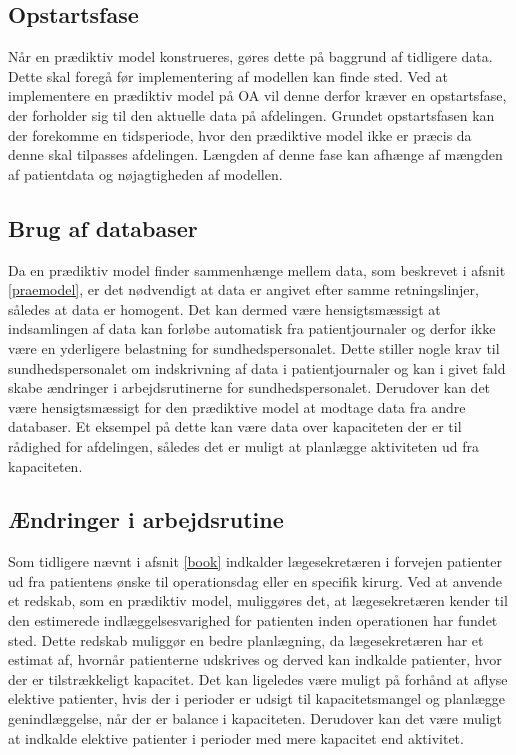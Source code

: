 \subsection{Opstartsfase}
Når en prædiktiv model konstrueres, gøres dette på baggrund af tidligere data. Dette skal foregå før implementering af modellen kan finde sted. Ved at implementere en prædiktiv model på OA vil denne derfor kræver en opstartsfase, der forholder sig til den aktuelle data på afdelingen. Grundet opstartsfasen kan der forekomme en tidsperiode, hvor den prædiktive model ikke er præcis da denne skal tilpasses afdelingen. Længden af denne fase kan afhænge af mængden af patientdata og nøjagtigheden af modellen.\cite{Kuhn2013}


\subsection{Brug af databaser}
Da en prædiktiv model finder sammenhænge mellem data, som beskrevet i afsnit \ref{praemodel}, er det nødvendigt at data er angivet efter samme retningslinjer, således at data er homogent\cite{Kuhn2013}. Det  kan dermed være hensigtsmæssigt at indsamlingen af data kan forløbe automatisk fra patientjournaler og derfor ikke være en yderligere belastning for sundhedspersonalet. Dette stiller nogle krav til sundhedspersonalet om indskrivning af data i patientjournaler og kan i givet fald skabe ændringer i arbejdsrutinerne for sundhedspersonalet. Derudover kan det være hensigtsmæssigt for den prædiktive model at modtage data fra andre databaser. Et eksempel på dette kan være data over kapaciteten der er til rådighed for afdelingen, således det er muligt at planlægge aktiviteten ud fra kapaciteten.


\subsection{Ændringer i arbejdsrutine}\label{arbjedsrut}
Som tidligere nævnt i afsnit \ref{book} indkalder lægesekretæren i forvejen patienter ud fra patientens ønske til operationsdag eller en specifik kirurg. Ved at anvende et redskab, som en prædiktiv model, muliggøres det, at lægesekretæren kender til den estimerede indlæggelsesvarighed for patienten inden operationen har fundet sted. 
Dette redskab muliggør en bedre planlægning, da lægesekretæren har et estimat af, hvornår patienterne udskrives og derved kan indkalde patienter, hvor der er tilstrækkeligt kapacitet. 
Det kan ligeledes være muligt på forhånd at aflyse elektive patienter, hvis der i perioder er udsigt til kapacitetsmangel og planlægge genindlæggelse, når der er balance i kapaciteten. Derudover kan det være muligt at indkalde elektive patienter i perioder med mere kapacitet end aktivitet. 


